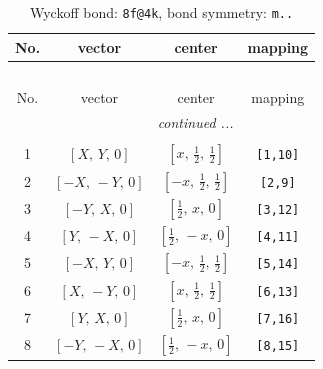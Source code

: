 \documentclass[fleqn,8pt]{jsarticle}
\begin{document}
\begin{longtable}{cccc}
\caption{Wyckoff bond: {\tt 8f@4k}, bond symmetry: {\tt m..}}
 \\
 \hline \hline
No. & vector & center & mapping \\ \hline \endfirsthead

\multicolumn{3}{l}{\tablename\ \thetable{}} \\
 \hline \hline
No. & vector & center & mapping \\ \hline \endhead

 \hline \hline
\multicolumn{3}{r}{\footnotesize\it continued ...} \\ \endfoot

 \hline \hline
\multicolumn{3}{r}{} \\ \endlastfoot

1 & $\left[ X,\, Y,\, 0 \right]$ & $\left[ x,\, \frac{1}{2},\, \frac{1}{2} \right]$ & {\tt [1,10]} \\ \hline
2 & $\left[ - X,\, - Y,\, 0 \right]$ & $\left[ - x,\, \frac{1}{2},\, \frac{1}{2} \right]$ & {\tt [2,9]} \\ \hline
3 & $\left[ - Y,\, X,\, 0 \right]$ & $\left[ \frac{1}{2},\, x,\, 0 \right]$ & {\tt [3,12]} \\ \hline
4 & $\left[ Y,\, - X,\, 0 \right]$ & $\left[ \frac{1}{2},\, - x,\, 0 \right]$ & {\tt [4,11]} \\ \hline
5 & $\left[ - X,\, Y,\, 0 \right]$ & $\left[ - x,\, \frac{1}{2},\, \frac{1}{2} \right]$ & {\tt [5,14]} \\ \hline
6 & $\left[ X,\, - Y,\, 0 \right]$ & $\left[ x,\, \frac{1}{2},\, \frac{1}{2} \right]$ & {\tt [6,13]} \\ \hline
7 & $\left[ Y,\, X,\, 0 \right]$ & $\left[ \frac{1}{2},\, x,\, 0 \right]$ & {\tt [7,16]} \\ \hline
8 & $\left[ - Y,\, - X,\, 0 \right]$ & $\left[ \frac{1}{2},\, - x,\, 0 \right]$ & {\tt [8,15]} \\
\end{longtable}
\renewcommand{\arraystretch}{1.2}
\end{document}
